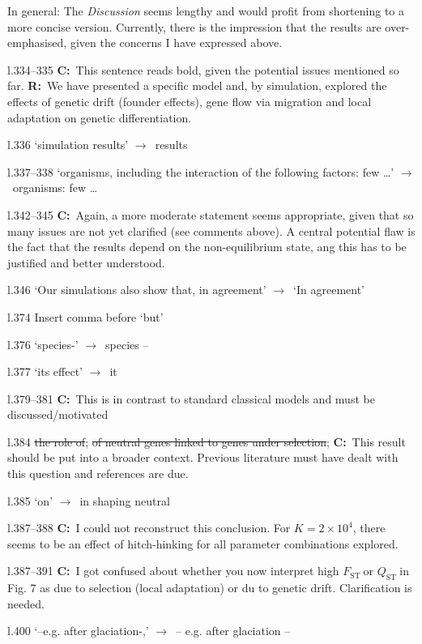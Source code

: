 \documentclass[11pt]{article}
\newenvironment{my_description}
{\begin{description}
  \setlength{\itemsep}{2pt}
  \setlength{\parskip}{0pt}
  \setlength{\parsep}{0pt}}
{\end{description}}
\newcommand{\ra}{$\rightarrow$\ }
\newcommand{\C}{\textbf{C:}\ }
\newcommand{\R}{\textbf{R:}\ }
\newcommand{\fst}{$F_{\mathrm{ST}}\ $}
\newcommand{\qst}{$Q_{\mathrm{ST}}\ $}
\begin{document}
\begin{my_description}
	\item[In general:] The \emph{Discussion} seems lengthy and would profit from shortening to a more concise version. Currently, there is the impression that the results are over-emphasised, given the concerns I have expressed above.
	\item[l.334--335] \C This sentence reads bold, given the potential issues mentioned so far. \R We have presented a specific model and, by simulation, explored the effects of genetic drift (founder effects), gene flow via migration and local adaptation on genetic differentiation.
	\item[l.336] `simulation results' \ra results
	\item[l.337--338] `organisms, including the interaction of the following factors: few \ldots{}' \ra organisms: few \ldots{}
	\item[l.342--345] \C Again, a more moderate statement seems appropriate, given that so many issues are not yet clarified (see comments above). A central potential flaw is the fact that the results depend on the non-equilibrium state, ang this has to be justified and better understood.
	\item[l.346] `Our simulations also show that, in agreement' \ra `In agreement'
	\item[l.374] Insert comma before `but'
	\item[l.376] `species-' \ra species --
	\item[l.377] `its effect' \ra it
	\item[l.379--381] \C This is in contrast to standard classical models and must be discussed/motivated
	\item[l.384] \sout{the role of}; \sout{of neutral genes linked to genes under selection}; \C This result should be put into a broader context. Previous literature must have dealt with this question and references are due.
	\item[l.385] `on' \ra in shaping neutral
	\item[l.387--388] \C I could not reconstruct this conclusion. For $K=2\times10^4$, there seems to be an effect of hitch-hinking for all parameter combinations explored.
	\item[l.387--391] \C I got confused about whether you now interpret high \fst or \qst in Fig. 7 as due to selection (local adaptation) or du to genetic drift. Clarification is needed.
	\item[l.400] `--e.g. after glaciation-,' \ra -- e.g. after glaciation -- 

\end{my_description}
\end{document}
